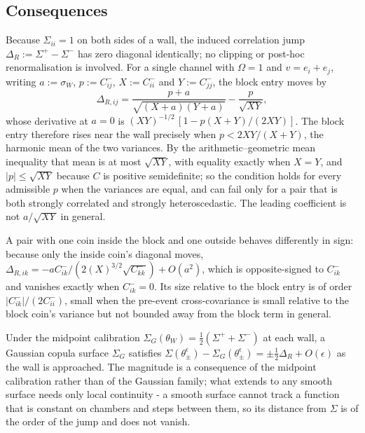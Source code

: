 \subsection*{Consequences}
Because $\Sigma_{ii}=1$ on both sides of a wall, the induced correlation jump $\Delta_R:=\Sigma^{+}-\Sigma^{-}$ has zero diagonal identically; no clipping or post-hoc renormalisation is involved. For a single channel with $\Omega=1$ and $v=e_i+e_j$, writing $a:=\sigma_W$, $p:=C^{-}_{ij}$, $X:=C^{-}_{ii}$ and $Y:=C^{-}_{jj}$, the block entry moves by
\[
\Delta_{R,ij}=\frac{p+a}{\sqrt{(X+a)(Y+a)}}-\frac{p}{\sqrt{XY}},
\]
whose derivative at $a=0$ is $(XY)^{-1/2}\,[1-p(X+Y)/(2XY)]$. The block entry therefore rises near the wall precisely when $p<2XY/(X+Y)$, the harmonic mean of the two variances. By the arithmetic--geometric mean inequality that mean is at most $\sqrt{XY}$, with equality exactly when $X=Y$, and $|p|\le\sqrt{XY}$ because $C$ is positive semidefinite; so the condition holds for every admissible $p$ when the variances are equal, and can fail only for a pair that is both strongly correlated and strongly heteroscedastic. The leading coefficient is not $a/\sqrt{XY}$ in general.

A pair with one coin inside the block and one outside behaves differently in sign: because only the inside coin's diagonal moves, $\Delta_{R,ik}=-aC^{-}_{ik}/(2(X)^{3/2}\sqrt{C^{-}_{kk}})+O(a^2)$, which is opposite-signed to $C^{-}_{ik}$ and vanishes exactly when $C^{-}_{ik}=0$. Its size relative to the block entry is of order $|C^{-}_{ik}|/(2C^{-}_{ii})$, small when the pre-event cross-covariance is small relative to the block coin's variance but not bounded away from the block term in general.

Under the midpoint calibration $\Sigma_G(\theta_W)=\tfrac12(\Sigma^{+}+\Sigma^{-})$ at each wall, a Gaussian copula surface $\Sigma_G$ satisfies $\Sigma(\theta^{\epsilon}_{\pm})-\Sigma_G(\theta^{\epsilon}_{\pm})=\pm\tfrac12\Delta_R+O(\epsilon)$ as the wall is approached. The magnitude is a consequence of the midpoint calibration rather than of the Gaussian family; what extends to any smooth surface needs only local continuity - a smooth surface cannot track a function that is constant on chambers and steps between them, so its distance from $\Sigma$ is of the order of the jump and does not vanish.

